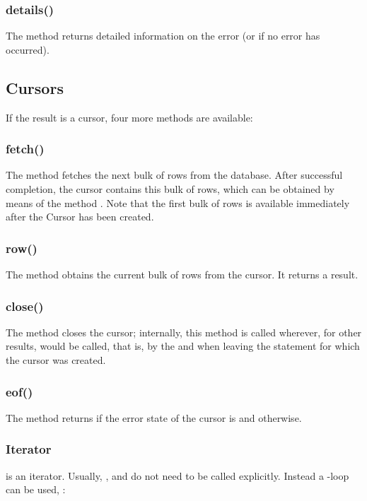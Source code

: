 \subsubsection{details()}
The method returns
detailed information on the error
(or  if no error has occurred).

\subsection{Cursors}
If the result is a cursor,
four more methods are available:

\subsubsection{fetch()}
The method fetches the next bulk
of rows from the database.
After successful completion,
the cursor contains this bulk
of rows, which can be obtained by means of
the method .
Note that the first bulk of rows
is available immediately after
the Cursor has been created.

\subsubsection{row()}
The method obtains the current
bulk of rows from the cursor.
It returns a  result.

\subsubsection{close()}
The method closes the cursor;
internally, this method is called
wherever, for other results, 
would be called, that is, by the 
and when leaving the  statement
for which the cursor was created.

\subsubsection{eof()}
The method returns 
if the error state of the cursor
is  and 
otherwise.

\subsubsection{Iterator}
 is an iterator.
Usually, , 
and  do not need to be called
explicitly.
Instead a -loop  can be used, \eg:

